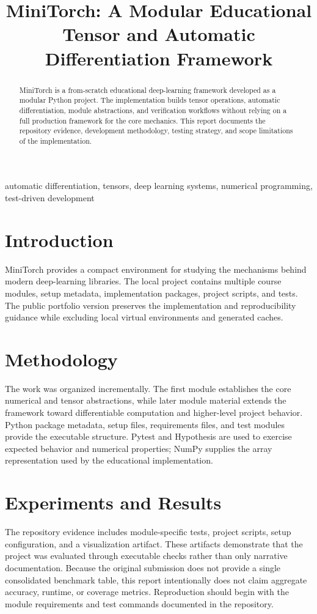 \documentclass[conference]{IEEEtran}
\title{MiniTorch: A Modular Educational Tensor and Automatic Differentiation Framework}
\author{\IEEEauthorblockN{Naga Sampath Maddineni}
\IEEEauthorblockA{University of North Texas}}
\begin{document}
\maketitle

\begin{abstract}
MiniTorch is a from-scratch educational deep-learning framework developed as a modular Python project. The implementation builds tensor operations, automatic differentiation, module abstractions, and verification workflows without relying on a full production framework for the core mechanics. This report documents the repository evidence, development methodology, testing strategy, and scope limitations of the implementation.
\end{abstract}

\begin{IEEEkeywords}
automatic differentiation, tensors, deep learning systems, numerical programming, test-driven development
\end{IEEEkeywords}

\section{Introduction}
MiniTorch provides a compact environment for studying the mechanisms behind modern deep-learning libraries. The local project contains multiple course modules, setup metadata, implementation packages, project scripts, and tests. The public portfolio version preserves the implementation and reproducibility guidance while excluding local virtual environments and generated caches.

\section{Methodology}
The work was organized incrementally. The first module establishes the core numerical and tensor abstractions, while later module material extends the framework toward differentiable computation and higher-level project behavior. Python package metadata, setup files, requirements files, and test modules provide the executable structure. Pytest and Hypothesis are used to exercise expected behavior and numerical properties; NumPy supplies the array representation used by the educational implementation.

\section{Experiments and Results}
The repository evidence includes module-specific tests, project scripts, setup configuration, and a visualization artifact. These artifacts demonstrate that the project was evaluated through executable checks rather than only narrative documentation. Because the original submission does not provide a single consolidated benchmark table, this report intentionally does not claim aggregate accuracy, runtime, or coverage metrics. Reproduction should begin with the module requirements and test commands documented in the repository.
\end{document}
